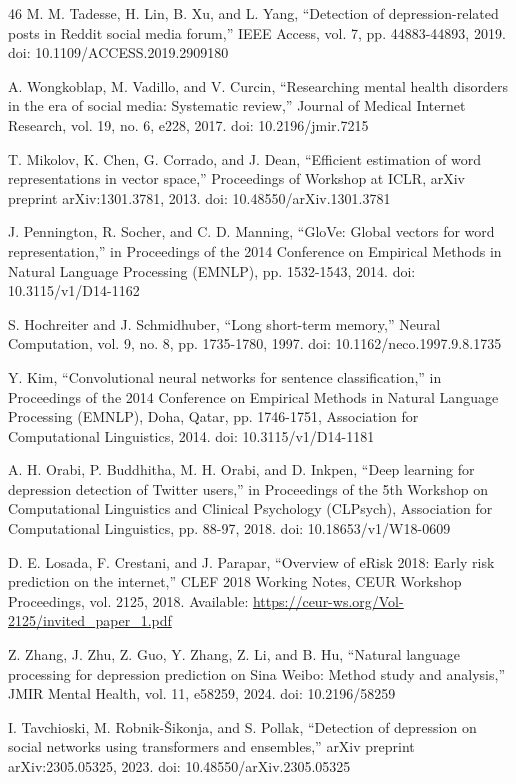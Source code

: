 \documentclass{ieeeaccess}
\begin{document}
\begin{thebibliography}{46}
 M. M. Tadesse, H. Lin, B. Xu, and L. Yang, ``Detection of depression-related posts in Reddit social media forum,'' IEEE Access, vol. 7, pp. 44883-44893, 2019. doi: 10.1109/ACCESS.2019.2909180

 A. Wongkoblap, M. Vadillo, and V. Curcin, ``Researching mental health disorders in the era of social media: Systematic review,'' Journal of Medical Internet Research, vol. 19, no. 6, e228, 2017. doi: 10.2196/jmir.7215

 T. Mikolov, K. Chen, G. Corrado, and J. Dean, ``Efficient estimation of word representations in vector space,'' Proceedings of Workshop at ICLR, arXiv preprint arXiv:1301.3781, 2013. doi: 10.48550/arXiv.1301.3781

 J. Pennington, R. Socher, and C. D. Manning, ``GloVe: Global vectors for word representation,'' in Proceedings of the 2014 Conference on Empirical Methods in Natural Language Processing (EMNLP), pp. 1532-1543, 2014. doi: 10.3115/v1/D14-1162

 S. Hochreiter and J. Schmidhuber, ``Long short-term memory,'' Neural Computation, vol. 9, no. 8, pp. 1735-1780, 1997. doi: 10.1162/neco.1997.9.8.1735

 Y. Kim, ``Convolutional neural networks for sentence classification,'' in Proceedings of the 2014 Conference on Empirical Methods in Natural Language Processing (EMNLP), Doha, Qatar, pp. 1746-1751, Association for Computational Linguistics, 2014. doi: 10.3115/v1/D14-1181

 A. H. Orabi, P. Buddhitha, M. H. Orabi, and D. Inkpen, ``Deep learning for depression detection of Twitter users,'' in Proceedings of the 5th Workshop on Computational Linguistics and Clinical Psychology (CLPsych), Association for Computational Linguistics, pp. 88-97, 2018. doi: 10.18653/v1/W18-0609

 D. E. Losada, F. Crestani, and J. Parapar, ``Overview of eRisk 2018: Early risk prediction on the internet,'' CLEF 2018 Working Notes, CEUR Workshop Proceedings, vol. 2125, 2018. Available: \url{https://ceur-ws.org/Vol-2125/invited_paper_1.pdf}

 Z. Zhang, J. Zhu, Z. Guo, Y. Zhang, Z. Li, and B. Hu, ``Natural language processing for depression prediction on Sina Weibo: Method study and analysis,'' JMIR Mental Health, vol. 11, e58259, 2024. doi: 10.2196/58259

 I. Tavchioski, M. Robnik-\v{S}ikonja, and S. Pollak, ``Detection of depression on social networks using transformers and ensembles,'' arXiv preprint arXiv:2305.05325, 2023. doi: 10.48550/arXiv.2305.05325


\end{thebibliography}
\end{document}
